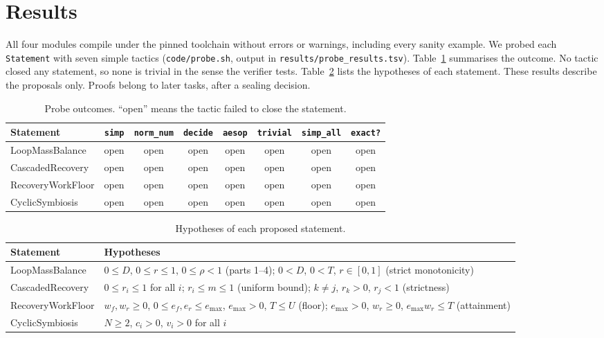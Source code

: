 \documentclass[11pt]{article}
\theoremstyle{remark}
\begin{document}
\section{Results}
\label{sec:results}
All four modules compile under the pinned toolchain without errors or warnings, including every
sanity example. We probed each \texttt{Statement} with seven simple tactics
(\texttt{code/probe.sh}, output in \texttt{results/probe\_results.tsv}). Table~\ref{tab:probe}
summarises the outcome. No tactic closed any statement, so none is trivial in the sense the
verifier tests. Table~\ref{tab:hyp} lists the hypotheses of each statement. These results describe
the proposals only. Proofs belong to later tasks, after a sealing decision.

\begin{table}[h]
\centering
\begin{tabular}{lccccccc}
\toprule
Statement & \texttt{simp} & \texttt{norm\_num} & \texttt{decide} & \texttt{aesop} & \texttt{trivial} & \texttt{simp\_all} & \texttt{exact?}\\
\midrule
LoopMassBalance & open & open & open & open & open & open & open \\
CascadedRecovery & open & open & open & open & open & open & open \\
RecoveryWorkFloor & open & open & open & open & open & open & open \\
CyclicSymbiosis & open & open & open & open & open & open & open \\
\bottomrule
\end{tabular}
\caption{Probe outcomes. ``open'' means the tactic failed to close the statement.}
\label{tab:probe}
\end{table}

\begin{table}[h]
\centering
\small
\begin{tabular}{lp{10.5cm}}
\toprule
Statement & Hypotheses \\
\midrule
LoopMassBalance & $0\le D$, $0\le r\le1$, $0\le\rho<1$ (parts 1--4); $0<D$, $0<T$, $r\in[0,1]$ (strict monotonicity)\\
CascadedRecovery & $0\le r_i\le1$ for all $i$; $r_i\le m\le1$ (uniform bound); $k\ne j$, $r_k>0$, $r_j<1$ (strictness)\\
RecoveryWorkFloor & $w_f,w_r\ge0$, $0\le e_f,e_r\le e_{\max}$, $e_{\max}>0$, $T\le U$ (floor); $e_{\max}>0$, $w_r\ge0$, $e_{\max}w_r\le T$ (attainment)\\
CyclicSymbiosis & $N\ge2$, $c_i>0$, $v_i>0$ for all $i$\\
\bottomrule
\end{tabular}
\caption{Hypotheses of each proposed statement.}
\label{tab:hyp}
\end{table}
\end{document}
